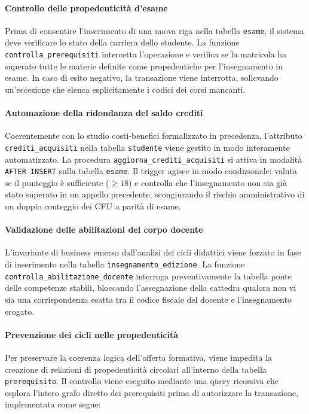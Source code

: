 \paragraph{Controllo delle propedeuticità d'esame}
Prima di consentire l'inserimento di una nuova riga nella tabella \texttt{esame}, il sistema deve verificare lo stato della carriera dello studente. La funzione \texttt{controlla\_prerequisiti} intercetta l'operazione e verifica se la matricola ha superato tutte le materie definite come propedeutiche per l'insegnamento in esame. In caso di esito negativo, la transazione viene interrotta, sollevando un'eccezione che elenca esplicitamente i codici dei corsi mancanti.

\paragraph{Automazione della ridondanza del saldo crediti}
Coerentemente con lo studio costi-benefici formalizzato in precedenza, l'attributo \texttt{crediti\_acquisiti} nella tabella \texttt{studente} viene gestito in modo interamente automatizzato. La procedura \texttt{aggiorna\_crediti\_acquisiti} si attiva in modalità \texttt{AFTER INSERT} sulla tabella \texttt{esame}. Il trigger agisce in modo condizionale: valuta se il punteggio è sufficiente ($\ge 18$) e controlla che l'insegnamento non sia già stato superato in un appello precedente, scongiurando il rischio amministrativo di un doppio conteggio dei CFU a parità di esame.

\paragraph{Validazione delle abilitazioni del corpo docente}
L'invariante di business emerso dall'analisi dei cicli didattici viene forzato in fase di inserimento nella tabella \texttt{insegnamento\_edizione}. La funzione \texttt{controlla\_abilitazione\_docente} interroga preventivamente la tabella ponte delle competenze stabili, bloccando l'assegnazione della cattedra qualora non vi sia una corrispondenza esatta tra il codice fiscale del docente e l'insegnamento erogato.

\paragraph{Prevenzione dei cicli nelle propedeuticità}
Per preservare la coerenza logica dell'offerta formativa, viene impedita la creazione di relazioni di propedeuticità circolari all'interno della tabella \texttt{prerequisito}. Il controllo viene eseguito mediante una query ricorsiva che esplora l'intero grafo diretto dei prerequisiti prima di autorizzare la transazione, implementata come segue:

